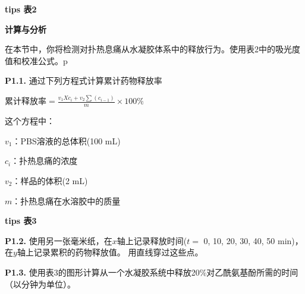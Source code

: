\textbf{tips 表2}

\noindent \textbf{计算与分析}

在本节中，你将检测对扑热息痛从水凝胶体系中的释放行为。使用表2中的吸光度值和校准公式。p

\noindent\textbf{P1.1.} 通过下列方程式计算累计药物释放率

\begin{center}
	累计释放率\(=\frac{v_1Xc_i+v_2\sum(c_{i-1})}{m}\times100\%\)
\end{center}

这个方程中：

\(v_1\)：PBS溶液的总体积(100 mL)

\(c_i\)：扑热息痛的浓度

\(v_2\)：样品的体积(2 mL)

\(m\)：扑热息痛在水溶胶中的质量

\textbf{tips 表3}

\noindent\textbf{P1.2.} 使用另一张毫米纸，在\(x\)轴上记录释放时间(\(t=\) 0, 10,
20, 30, 40, 50 min)，在\(y\)轴上记录累积的药物释放值。
用直线穿过这些点。

\noindent\textbf{P1.3.}
使用表3的图形计算从一个水凝胶系统中释放20\%对乙酰氨基酚所需的时间（以分钟为单位）。
